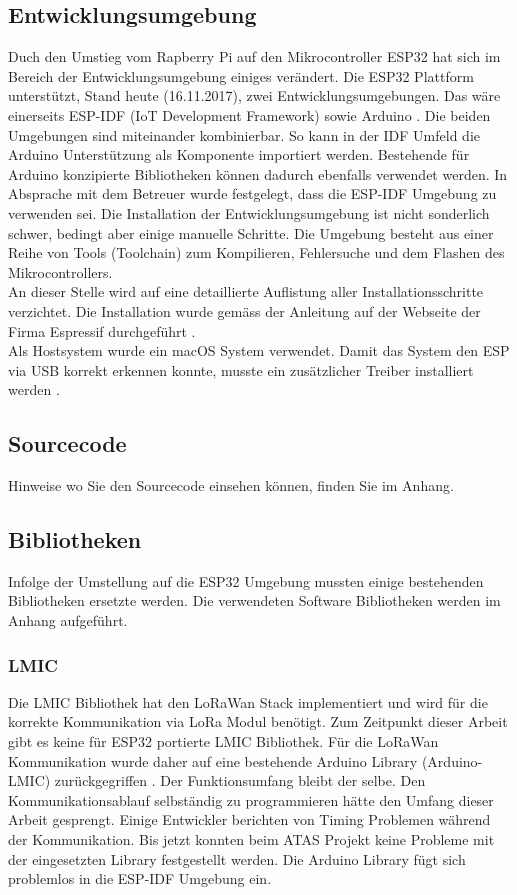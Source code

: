 \documentclass[11pt,english,german]{report}
\theoremstyle{definition}
\begin{document}
\subsection{Entwicklungsumgebung}
Duch den Umstieg vom Rapberry Pi auf den Mikrocontroller ESP32 hat sich im Bereich der Entwicklungsumgebung einiges verändert. Die ESP32 Plattform unterstützt, Stand heute (16.11.2017), zwei Entwicklungsumgebungen. Das wäre einerseits ESP-IDF (IoT Development Framework) sowie Arduino \cite{espidfarduino}. Die beiden Umgebungen sind miteinander kombinierbar. So kann in der IDF Umfeld die Arduino Unterstützung als Komponente importiert werden. Bestehende für Arduino konzipierte Bibliotheken können dadurch ebenfalls verwendet werden. In Absprache mit dem Betreuer wurde festgelegt, dass die ESP-IDF Umgebung zu verwenden sei. Die Installation der Entwicklungsumgebung ist nicht sonderlich schwer, bedingt aber einige manuelle Schritte. Die Umgebung besteht aus einer Reihe von Tools (Toolchain) zum Kompilieren, Fehlersuche und dem Flashen des Mikrocontrollers.\\[0.3cm]
An dieser Stelle wird auf eine detaillierte Auflistung aller Installationsschritte verzichtet. Die Installation wurde gemäss der Anleitung auf der Webseite der Firma Espressif durchgeführt \cite{espidfinstallation}.\\[0.3cm]
Als Hostsystem wurde ein macOS System verwendet. Damit das System den ESP via USB korrekt erkennen konnte, musste ein zusätzlicher Treiber installiert werden \cite{espidfdriver}. 

\subsection{Sourcecode}
Hinweise wo Sie den Sourcecode einsehen können, finden Sie im Anhang.

\newpage

\subsection{Bibliotheken}
Infolge der Umstellung auf die ESP32 Umgebung mussten einige bestehenden Bibliotheken ersetzte werden. Die verwendeten Software Bibliotheken werden im Anhang aufgeführt.

\subsubsection{LMIC}
Die LMIC Bibliothek hat den LoRaWan Stack implementiert und wird für die korrekte Kommunikation via LoRa Modul benötigt. Zum Zeitpunkt dieser Arbeit gibt es keine für ESP32 portierte LMIC Bibliothek. Für die LoRaWan Kommunikation wurde daher auf eine bestehende Arduino Library (Arduino-LMIC) zurückgegriffen \cite{ArduinoLMIC}. Der Funktionsumfang bleibt der selbe. Den Kommunikationsablauf selbständig zu programmieren hätte den Umfang dieser Arbeit gesprengt. Einige Entwickler berichten von Timing Problemen während der Kommunikation. Bis jetzt konnten beim ATAS Projekt keine Probleme mit der eingesetzten Library festgestellt werden. Die Arduino Library fügt sich problemlos in die ESP-IDF Umgebung ein.
\end{document}
